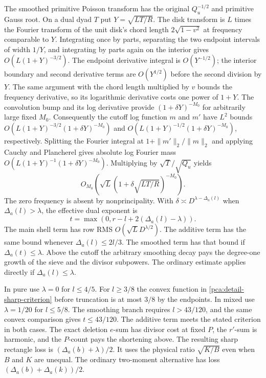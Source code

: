 The smoothed primitive Poisson transform has the original
\(Q_u^{-1/2}\) and primitive Gauss root. On a dual dyad \(T\)
put \(Y=\sqrt{LT/R}\). The disk transform is \(L\) times
the Fourier transform of the unit disk's chord length
\(2\sqrt{1-v^2}\) at frequency comparable to \(Y\).
Integrating once by parts, separating the two endpoint
intervals of width \(1/Y\), and integrating by parts again
on the interior gives \(O(L(1+Y)^{-3/2})\).
The endpoint derivative integral is \(O(Y^{-1/2})\);
the interior boundary and second derivative terms
are \(O(Y^{1/2})\) before the second division by \(Y\).
The same argument with the chord length multiplied by \(v\)
bounds the frequency derivative, so its logarithmic derivative
costs one power of \(1+Y\). The convolution bump and its
log derivative provide \((1+\delta Y)^{-M_0}\)
for arbitrarily large fixed \(M_0\).
Consequently the cutoff log function \(m\) and \(m'\)
have \(L^2\) bounds \(O(L(1+Y)^{-3/2}(1+\delta Y)^{-M_0})\)
and \(O(L(1+Y)^{-1/2}(1+\delta Y)^{-M_0})\), respectively.
Splitting the Fourier integral at
\(1+\|m'\|_2/\|m\|_2\) and applying Cauchy and Plancherel
gives absolute log Fourier mass
\(O(L(1+Y)^{-1}(1+\delta Y)^{-M_0})\).
Multiplying by \(\sqrt T/\sqrt{Q_u}\) yields
\[
 O_{M_0}\!\left(\sqrt L
     (1+\delta\sqrt{LT/R})^{-M_0}\right).
\]
The zero frequency is absent by nonprincipality.
With \(\delta\asymp D^{\lambda-\Delta_a(l)}\)
when \(\Delta_a(l)>\lambda\), the effective dual exponent is
\begin{equation}\label{pca:detail-sharp-criterion}
 t=\max(0,r-l+2(\Delta_a(l)-\lambda)).
\end{equation}
The main shell term has row RMS \(O(\sqrt L D^{\lambda/2})\).
The additive term has the same bound whenever
\(\Delta_a(l)\le2l/3\). The smoothed term has that bound if
\(\Delta_a(t)\le\lambda\). Above the cutoff the arbitrary
smoothing decay pays the degree-one growth of the sieve and
the divisor subpowers. The ordinary estimate applies directly
if \(\Delta_a(l)\le\lambda\).

In pure use \(\lambda=0\) for \(l\le4/5\).
For \(l\ge3/8\) the convex function in
\eqref{pca:detail-sharp-criterion} before truncation is at
most \(3/8\) by the endpoints. In mixed use
\(\lambda=1/20\) for \(l\le5/8\). The smoothing branch
requires \(l>43/120\), and the same convex comparison gives
\(t\le43/120\). The additive term meets the stated criterion
in both cases. The exact deletion \(e\)-sum has divisor cost
at fixed \(P\), the \(r'\)-sum is harmonic, and the \(P\)-count
pays the shortening above. The resulting sharp rectangle
loss is \((\Delta_a(b)+\lambda)/2\). It uses the physical
ratio \(\sqrt{K/B}\) even when \(B\) and \(K\) are unequal.
The ordinary two-moment alternative has loss
\((\Delta_a(b)+\Delta_a(k))/2\).

